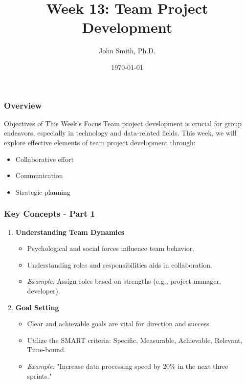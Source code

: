 \documentclass[aspectratio=169]{beamer}
\title[Week 13: Team Project Development]{Week 13: Team Project Development}
\author[J. Smith]{John Smith, Ph.D.}
\date{\today}
\begin{document}
\frame{\titlepage}

\begin{frame}[fragile]
    \titlepage
\end{frame}

\begin{frame}[fragile]
    \frametitle{Overview}
    \begin{block}{Objectives of This Week's Focus}
        Team project development is crucial for group endeavors, especially in technology and data-related fields. This week, we will explore effective elements of team project development through:
        \begin{itemize}
            \item Collaborative effort
            \item Communication
            \item Strategic planning
        \end{itemize}
    \end{block}
\end{frame}

\begin{frame}[fragile]
    \frametitle{Key Concepts - Part 1}
    \begin{enumerate}
        \item \textbf{Understanding Team Dynamics}
            \begin{itemize}
                \item Psychological and social forces influence team behavior.
                \item Understanding roles and responsibilities aids in collaboration.
                \item \textit{Example:} Assign roles based on strengths (e.g., project manager, developer).
            \end{itemize}

        \item \textbf{Goal Setting}
            \begin{itemize}
                \item Clear and achievable goals are vital for direction and success.
                \item Utilize the SMART criteria: Specific, Measurable, Achievable, Relevant, Time-bound.
                \item \textit{Example:} "Increase data processing speed by 20\% in the next three sprints."
            \end{itemize}
    \end{enumerate}
\end{frame}
\end{document}
